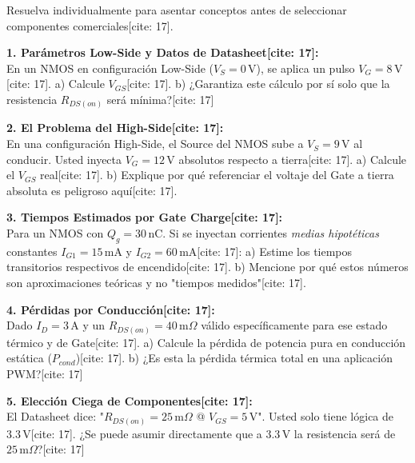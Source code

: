 \documentclass[11pt, a4paper]{article}
\begin{document}
\begin{tcolorbox}[colback=ucbblue!5, colframe=ucbblue, title=\textbf{Hoja B: Ejercicios de Transferencia Conceptual (Uso Estudiante)[cite: 17]}]
    Resuelva individualmente para asentar conceptos antes de seleccionar componentes comerciales[cite: 17].
\end{tcolorbox}

\textbf{1. Parámetros Low-Side y Datos de Datasheet[cite: 17]:} \\
En un NMOS en configuración Low-Side ($V_S = 0\,\text{V}$), se aplica un pulso $V_G = 8\,\text{V}$[cite: 17]. 
a) Calcule $V_{GS}$[cite: 17]. 
b) ¿Garantiza este cálculo por sí solo que la resistencia $R_{DS(on)}$ será mínima?[cite: 17] \hrulefill

\vspace{0.4cm}
\textbf{2. El Problema del High-Side[cite: 17]:} \\
En una configuración High-Side, el Source del NMOS sube a $V_S = 9\,\text{V}$ al conducir. Usted inyecta $V_G = 12\,\text{V}$ absolutos respecto a tierra[cite: 17]. 
a) Calcule el $V_{GS}$ real[cite: 17]. 
b) Explique por qué referenciar el voltaje del Gate a tierra absoluta es peligroso aquí[cite: 17]. \hrulefill

\vspace{0.4cm}
\textbf{3. Tiempos Estimados por Gate Charge[cite: 17]:} \\
Para un NMOS con $Q_g = 30\,\text{nC}$. Si se inyectan corrientes \textit{medias hipotéticas} constantes $I_{G1} = 15\,\text{mA}$ y $I_{G2} = 60\,\text{mA}$[cite: 17]: 
a) Estime los tiempos transitorios respectivos de encendido[cite: 17]. 
b) Mencione por qué estos números son aproximaciones teóricas y no "tiempos medidos"[cite: 17]. \hrulefill

\vspace{0.4cm}
\textbf{4. Pérdidas por Conducción[cite: 17]:} \\
Dado $I_D = 3\,\text{A}$ y un $R_{DS(on)} = 40\,\text{m}\Omega$ válido específicamente para ese estado térmico y de Gate[cite: 17]. 
a) Calcule la pérdida de potencia pura en conducción estática ($P_{cond}$)[cite: 17]. 
b) ¿Es esta la pérdida térmica total en una aplicación PWM?[cite: 17] \hrulefill

\vspace{0.4cm}
\textbf{5. Elección Ciega de Componentes[cite: 17]:} \\
El Datasheet dice: "$R_{DS(on)} = 25\,\text{m}\Omega$ @ $V_{GS} = 5\,\text{V}$". Usted solo tiene lógica de $3.3\,\text{V}$[cite: 17]. 
¿Se puede asumir directamente que a $3.3\,\text{V}$ la resistencia será de $25\,\text{m}\Omega$?[cite: 17] \hrulefill
\end{document}
